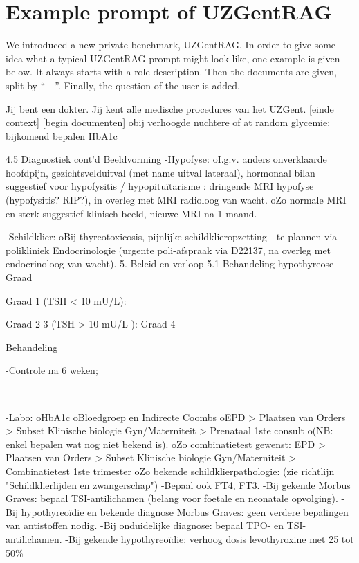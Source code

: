 \chapter{Example prompt of UZGentRAG}
\label{sec:example_prompt}

We introduced a new private benchmark, UZGentRAG. In order to give some idea what a typical UZGentRAG prompt might look like, one example is given below. It always starts with a role description. Then the documents are given, split by ``---''. Finally, the question of the user is added.

\begin{wrapverbatim}
Jij bent een dokter. Jij kent alle medische procedures van het UZGent.
[einde context]
[begin documenten]
obij verhoogde nuchtere of at random glycemie: bijkomend bepalen HbA1c
 
4.5 Diagnostiek cont'd 
Beeldvorming 
-Hypofyse:
oI.g.v. anders onverklaarde hoofdpijn, gezichtsvelduitval (met name uitval lateraal), 
hormonaal bilan suggestief voor hypofysitis / hypopituïtarisme : dringende MRI hypofyse 
(hypofysitis? RIP?), in overleg met MRI radioloog van wacht.
oZo normale MRI en sterk suggestief klinisch beeld, nieuwe MRI na 1 maand.
 
-Schildklier:
oBij thyreotoxicosis, pijnlijke schildklieropzetting - te plannen via polikliniek Endocrinologie 
(urgente poli-afspraak via D22137, na overleg met endocrinoloog van wacht).
5. Beleid en verloop
5.1 Behandeling hypothyreose
Graad
 
Graad 1
(TSH < 10 mU/L): 
 
Graad 2-3
(TSH > 10 mU/L ): Graad 4
 
 
Behandeling
 
-Controle na 6 weken;

---

-Labo:
oHbA1c
oBloedgroep en Indirecte Coombs
oEPD >  Plaatsen van Orders > Subset Klinische biologie Gyn/Materniteit > Prenataal 1ste 
consult
o(NB: enkel bepalen wat nog niet bekend is).
oZo combinatietest gewenst: EPD >  Plaatsen van Orders > Subset Klinische biologie 
Gyn/Materniteit > Combinatietest 1ste trimester
oZo bekende schildklierpathologie: (zie richtlijn "Schildklierlijden en zwangerschap")
-Bepaal ook FT4, FT3.
-Bij gekende Morbus Graves: bepaal TSI-antilichamen (belang voor foetale en neonatale 
opvolging).
-Bij hypothyreoïdie en bekende diagnose Morbus Graves: geen verdere bepalingen van 
antistoffen nodig.
-Bij onduidelijke diagnose: bepaal TPO- en TSI-antilichamen.
-Bij gekende hypothyreoïdie: verhoog dosis levothyroxine met 25 tot 50\%


\end{wrapverbatim}
